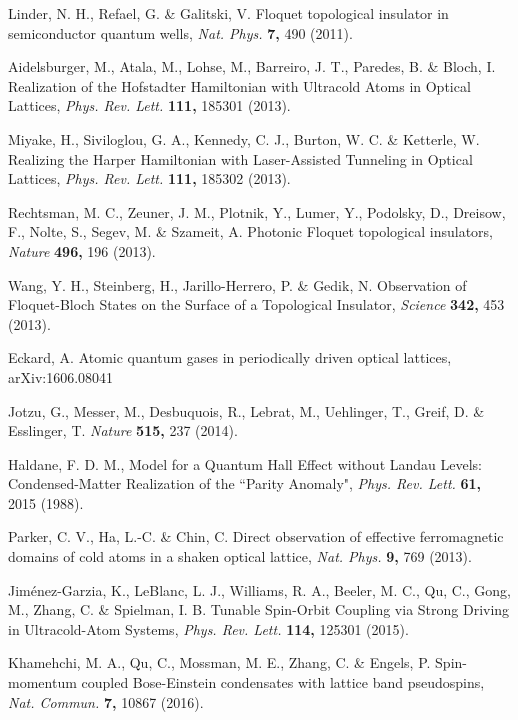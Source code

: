 \documentclass[aps,prl,twocolumn,floatfix,reprint]{revtex4}
\begin{document}
\begin{thebibliography}{99}
 Linder, N. H., Refael, G. \& Galitski, V. Floquet
topological insulator in semiconductor quantum wells, \textit{Nat. Phys.}
\textbf{7,} 490 (2011).

 Aidelsburger, M., Atala, M., Lohse, M., Barreiro,
J. T., Paredes, B. \& Bloch, I. Realization of the Hofstadter Hamiltonian
with Ultracold Atoms in Optical Lattices, \textit{Phys. Rev. Lett.} \textbf{%
111,} 185301 (2013).

 Miyake, H., Siviloglou, G. A., Kennedy, C. J., Burton,
W. C. \& Ketterle, W. Realizing the Harper Hamiltonian with Laser-Assisted
Tunneling in Optical Lattices, \textit{Phys. Rev. Lett.} \textbf{111,}
185302 (2013).

 Rechtsman, M. C., Zeuner, J. M., Plotnik, Y., Lumer,
Y., Podolsky, D., Dreisow, F., Nolte, S., Segev, M. \& Szameit, A. Photonic
Floquet topological insulators, \textit{Nature} \textbf{496,} 196 (2013).

 Wang, Y. H., Steinberg, H., Jarillo-Herrero, P. \& Gedik,
N. Observation of Floquet-Bloch States on the Surface of a Topological
Insulator, \textit{Science} \textbf{342,} 453 (2013).

 Eckard, A. Atomic quantum gases in periodically driven
optical lattices, arXiv:1606.08041

 Jotzu, G., Messer, M., Desbuquois, R., Lebrat, M.,
Uehlinger, T., Greif, D. \& Esslinger, T. \textit{Nature} \textbf{515,} 237
(2014).

 Haldane, F. D. M., Model for a Quantum Hall Effect
without Landau Levels: Condensed-Matter Realization of the ``Parity
Anomaly", \textit{Phys. Rev. Lett.} \textbf{61,} 2015 (1988).

 Parker, C. V., Ha, L.-C. \& Chin, C. Direct observation
of effective ferromagnetic domains of cold atoms in a shaken optical
lattice, \textit{Nat. Phys.} \textbf{9,} 769 (2013).

 Jim\'enez-Garzia, K., LeBlanc, L. J., Williams, R.
A., Beeler, M. C., Qu, C., Gong, M., Zhang, C. \& Spielman, I. B. Tunable
Spin-Orbit Coupling via Strong Driving in Ultracold-Atom Systems, \textit{%
Phys. Rev. Lett.} \textbf{114,} 125301 (2015).

 Khamehchi, M. A., Qu, C., Mossman, M. E., Zhang, C.
\& Engels, P. Spin-momentum coupled Bose-Einstein condensates with lattice
band pseudospins, \textit{Nat. Commun.} \textbf{7,} 10867 (2016).


\end{thebibliography}
\end{document}
